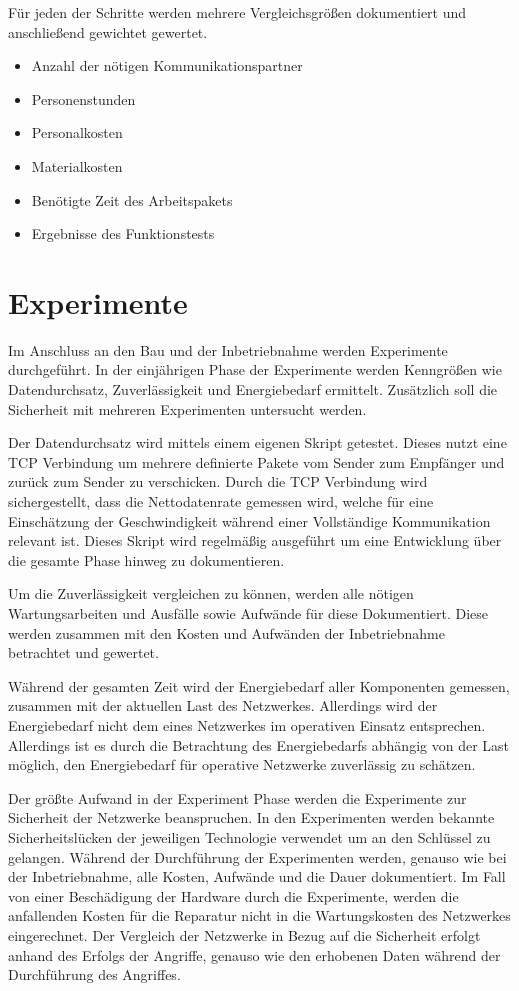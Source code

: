 Für jeden der Schritte werden mehrere Vergleichsgrößen dokumentiert und anschließend gewichtet gewertet.

\begin{itemize}
    \item Anzahl der nötigen Kommunikationspartner
    \item Personenstunden
    \item Personalkosten
    \item Materialkosten
    \item Benötigte Zeit des Arbeitspakets
    \item Ergebnisse des Funktionstests
\end{itemize}

\section{Experimente}

Im Anschluss an den Bau und der Inbetriebnahme werden Experimente durchgeführt.
In der einjährigen Phase der Experimente werden Kenngrößen wie Datendurchsatz, Zuverlässigkeit und Energiebedarf ermittelt.
Zusätzlich soll die Sicherheit mit mehreren Experimenten untersucht werden.

Der Datendurchsatz wird mittels einem eigenen Skript getestet.
Dieses nutzt eine \ac{TCP} Verbindung um mehrere definierte Pakete vom Sender zum Empfänger und zurück zum Sender zu verschicken.
Durch die \ac{TCP} Verbindung wird sichergestellt, dass die Nettodatenrate gemessen wird, welche für eine Einschätzung der Geschwindigkeit während einer Vollständige Kommunikation relevant ist.
Dieses Skript wird regelmäßig ausgeführt um eine Entwicklung über die gesamte Phase hinweg zu dokumentieren.

Um die Zuverlässigkeit vergleichen zu können, werden alle nötigen Wartungsarbeiten und Ausfälle sowie Aufwände für diese Dokumentiert.
Diese werden zusammen mit den Kosten und Aufwänden der Inbetriebnahme betrachtet und gewertet.

Während der gesamten Zeit wird der Energiebedarf aller Komponenten gemessen, zusammen mit der aktuellen Last des Netzwerkes.
Allerdings wird der Energiebedarf nicht dem eines Netzwerkes im operativen Einsatz entsprechen.
Allerdings ist es durch die Betrachtung des Energiebedarfs abhängig von der Last möglich, den Energiebedarf für operative Netzwerke zuverlässig zu schätzen.

Der größte Aufwand in der Experiment Phase werden die Experimente zur Sicherheit der Netzwerke beanspruchen.
In den Experimenten werden bekannte Sicherheitslücken der jeweiligen Technologie verwendet um an den Schlüssel zu gelangen.
Während der Durchführung der Experimenten werden, genauso wie bei der Inbetriebnahme, alle Kosten, Aufwände und die Dauer dokumentiert.
Im Fall von einer Beschädigung der Hardware durch die Experimente, werden die anfallenden Kosten für die Reparatur nicht in die Wartungskosten des Netzwerkes eingerechnet.
Der Vergleich der Netzwerke in Bezug auf die Sicherheit erfolgt anhand des Erfolgs der Angriffe, genauso wie den erhobenen Daten während der Durchführung des Angriffes.

